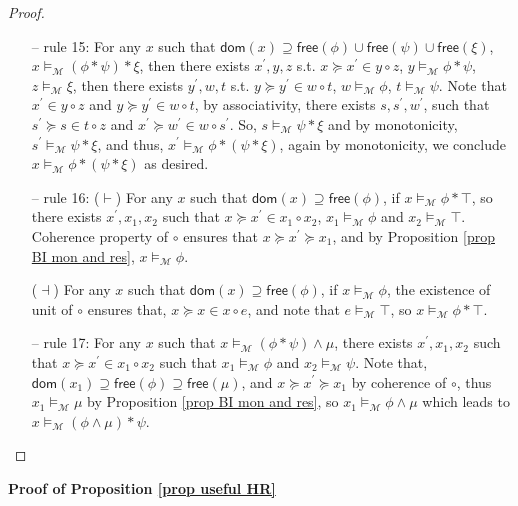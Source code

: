 \documentclass[conference,compsoc, 10pt]{IEEEtran}
\newcommand {\cM } {{\mathcal{M}}}
\newcommand {\Ldom }[1] {{\mathsf{dom}\!\left(#1\right)}}
\newcommand {\Lfree }[1] {{\mathsf{free}{\left(#1\right)}}}
\begin{document}
\begin{appendices}
\begin{proof}
\begin{itemize}
				\item[--] rule 15: For any $x$ such that $\Ldom{x}\supseteq\Lfree{\phi}\cup\Lfree{\psi}\cup\Lfree{\xi}$, $x\models_\cM(\phi\ast\psi)\ast\xi$, then there exists $x^\prime,y,z$ s.t. $x\succeq x^\prime\in y\circ z$, $y\models_\cM\phi\ast\psi$, $z\models_\cM\xi$, then there exists $y^\prime,w,t$ s.t. $y\succeq y^\prime\in w\circ t$, $w\models_\cM\phi$, $t\models_\cM\psi$. Note that $x^\prime\in y\circ z$ and $y\succeq y^\prime\in w\circ t$, by associativity, there exists $s,s^\prime,w^\prime$, such that $s^\prime\succeq s\in t\circ z$ and $x^\prime\succeq w^\prime\in w\circ s^\prime$. So, $s\models_\cM\psi\ast\xi$ and by monotonicity, $s^\prime\models_\cM\psi\ast\xi$, and thus, $x^\prime\models_\cM\phi\ast(\psi\ast\xi)$, again by monotonicity, we conclude $x\models_\cM\phi\ast(\psi\ast\xi)$ as desired.
				\item[--] rule 16: ($\vdash$) For any $x$ such that $\Ldom{x}\supseteq\Lfree{\phi}$, if $x\models_\cM\phi\ast\top$, so there exists $x^\prime,x_1,x_2$ such that $x\succeq x^\prime \in x_1\circ x_2$, $x_1\models_\cM \phi$ and $x_2\models_\cM \top$. Coherence property of $\circ$ ensures that $x\succeq x^\prime\succeq x_1$, and by Proposition \ref{prop BI mon and res}, $x\models_\cM\phi$.
				
				($\dashv$) For any $x$ such that $\Ldom{x}\supseteq\Lfree{\phi}$, if $x\models_\cM\phi$, the existence of unit of $\circ$ ensures that, $x\succeq x\in x\circ e$, and note that $e\models_\cM\top$, so $x\models_\cM \phi\ast\top$.
				\item[--] rule 17: 	For any $x$ such that $x\models_\cM(\phi\ast\psi)\wedge\mu$, there exists $x^\prime,x_1,x_2$ such that $x\succeq x^\prime\in x_1\circ x_2$ such that $x_1\models_\cM\phi$ and $x_2\models_\cM\psi$. Note that, $\Ldom{x_1}\supseteq\Lfree{\phi}\supseteq\Lfree{\mu}$, and $x\succeq x^\prime\succeq x_1$ by coherence of $\circ$, thus $x_1\models_\cM\mu$ by Proposition \ref{prop BI mon and res}, so $x_1\models_\cM\phi\wedge\mu$ which leads to $x\models_\cM(\phi\wedge\mu)\ast\psi$.
			\end{itemize}
			
		\end{proof}
		
		\vspace{0.5cm}
		
		\noindent\textbf{Proof of Proposition \ref{prop useful HR}}
		

\end{appendices}
\end{document}
